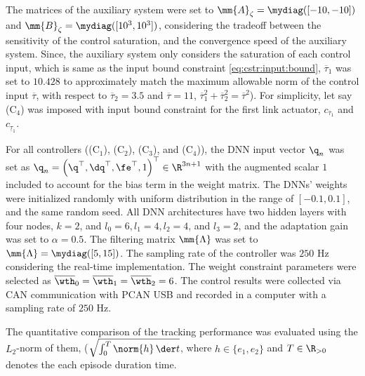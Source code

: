 \documentclass[lettersize,journal]{IEEEtran}
\begin{document}
The matrices of the auxiliary system were set to $\mm{A}_\zeta=\mydiag([-10,-10])$ and $\mm{B}_\zeta=\mydiag([10^3,10^3])$, considering the tradeoff between the sensitivity of the control saturation, and the convergence speed of the auxiliary system.
Since, the auxiliary system only considers the saturation of each control input, \ie which is same as the input bound constraint \eqref{eq:cstr:input:bound}, $\overline{\tau}_1$ was set to $10.428$ to approximately match the maximum allowable norm of the control input $\overline\tau$, with respect to $\overline{\tau}_2=3.5$ and $\overline{\tau}=11$, \ie $\overline{\tau}_1^2+\overline{\tau}_2^2=\overline{\tau}^2$).
For simplicity, let say (C$_4$) was imposed with input bound constraint for the first link actuator, \ie $c_{\overline{\tau}_1}$ and $c_{\underline{\tau}_1}$.

\hfill

For all controllers ((C$_1$), (C$_2$), (C$_3$), and (C$_4$)), the DNN input vector ${\q}_n$ was set as ${\q}_n=\left(\q^\top,\dq^\top,\fe^\top,1\right)^\top\in\R^{3n+1}$ with the augmented scalar $1$ included to account for the bias term in the weight matrix. 
The DNNs' weights were initialized randomly with uniform distribution in the range of $[-0.1,0.1]$, and the same random seed.
All DNN architectures have two hidden layers with four nodes, \ie $k=2$, and $l_0=6, l_1=4, l_2=4$, and $l_3=2$, and the adaptation gain was set to $\alpha=0.5$.
The filtering matrix $\mm{\Lambda}$ was set to $\mm{\Lambda}=\mydiag([5,15])$.
The sampling rate of the controller was $250$ Hz considering the real-time implementation.
The weight constraint parameters were selected as $\overline\wth_0=\overline\wth_1=\overline\wth_2=6$.
The control results were collected via CAN communication with PCAN USB  and recorded in a computer with a sampling rate of $250$ Hz.

The quantitative comparison of the tracking performance was evaluated using the $L_2$-norm of them, (\ie $\sqrt{\int_0^T\norm{h}\,\der t}$, where $h\in\{e_1,e_2\}$ and $T\in\R_{>0}$ denotes the each episode duration time.
\end{document}
